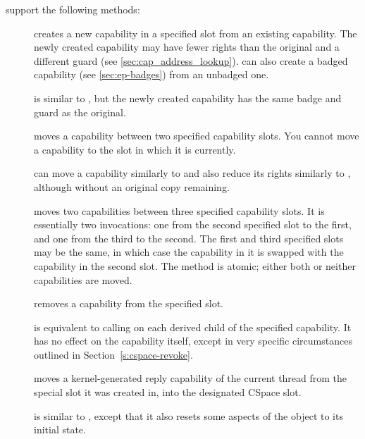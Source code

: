  support the following methods:
\begin{description}
\item[] creates a new
  capability in a specified  slot from an existing
  capability.  The newly created capability may have fewer rights than
  the original and a different guard (see
  \autoref{sec:cap_address_lookup}). 
  can also create a badged capability (see \autoref{sec:ep-badges})
  from an unbadged one.
\item[] is similar to
  , but the newly created
  capability has the same badge and guard as the original.
\item[] moves a capability
  between two specified capability slots. You cannot move a capability
  to the slot in which it is currently.
\item[] can move a
  capability similarly to  and
  also reduce its rights similarly to
  , although without an
  original copy remaining.
\item[] moves two
  capabilities between three specified capability slots. It is
  essentially two  invocations:
  one from the second specified slot to the first, and one from the
  third to the second. The first and third specified slots may be the
  same, in which case the capability in it is swapped with the
  capability in the second slot. The method is atomic; either both or
  neither capabilities are moved.
\item[] removes a
  capability from the specified slot.
\item[] is equivalent to
  calling  on each derived
  child of the specified capability. It has no effect on the
  capability itself, except in very specific circumstances outlined
  in Section~\ref{s:cspace-revoke}.
\item[] moves a
  kernel-generated reply capability of the current thread from the
  special  slot it was created in, into the designated CSpace
  slot.
\item[] is similar to
  , except that it also
  resets some aspects of the object to its initial state.
\end{description}

